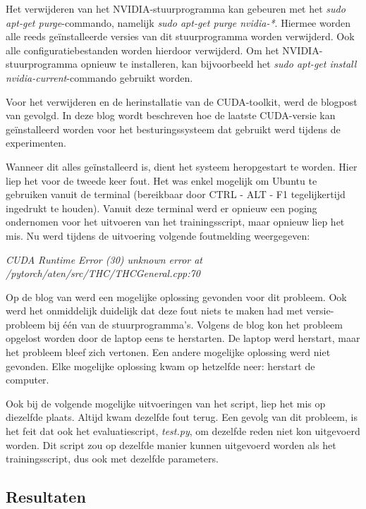 Het verwijderen van het NVIDIA-stuurprogramma kan gebeuren met het \textit{sudo apt-get purge}-commando, namelijk \textit{sudo apt-get purge nvidia-*}. Hiermee worden alle reeds geïnstalleerde versies van dit stuurprogramma worden verwijderd. Ook alle configuratiebestanden worden hierdoor verwijderd. Om het NVIDIA-stuurprogramma opnieuw te installeren, kan bijvoorbeeld het \textit{sudo apt-get install nvidia-current}-commando gebruikt worden.

Voor het verwijderen en de herinstallatie van de CUDA-toolkit, werd de blogpost van \textcite{cudainstall} gevolgd. In deze blog wordt beschreven hoe de laatste CUDA-versie kan geïnstalleerd worden voor het besturingssysteem dat gebruikt werd tijdens de experimenten.

Wanneer dit alles geïnstalleerd is, dient het systeem heropgestart te worden. Hier liep het voor de tweede keer fout. Het was enkel mogelijk om Ubuntu te gebruiken vanuit de terminal (bereikbaar door CTRL - ALT - F1 tegelijkertijd ingedrukt te houden). Vanuit deze terminal werd er opnieuw een poging ondernomen voor het uitvoeren van het trainingsscript, maar opnieuw liep het mis. Nu werd tijdens de uitvoering volgende foutmelding weergegeven:

\begin{center}
	\textit{CUDA Runtime Error (30) unknown error at /pytorch/aten/src/THC/THCGeneral.cpp:70}
\end{center}

Op de blog van \textcite{cudablog} werd een mogelijke oplossing gevonden voor dit probleem. Ook werd het onmiddelijk duidelijk dat deze fout niets te maken had met versie-probleem bij één van de stuurprogramma's. Volgens de blog kon het probleem opgelost worden door de laptop eens te herstarten. De laptop werd herstart, maar het probleem bleef zich vertonen. Een andere mogelijke oplossing werd niet gevonden. Elke mogelijke oplossing kwam op hetzelfde neer: herstart de computer.

Ook bij de volgende mogelijke uitvoeringen van het script, liep het mis op diezelfde plaats. Altijd kwam dezelfde fout terug. Een gevolg van dit probleem, is het feit dat ook het evaluatiescript, \textit{test.py}, om dezelfde reden niet kon uitgevoerd worden. Dit script zou op dezelfde manier kunnen uitgevoerd worden als het trainingsscript, dus ook met dezelfde parameters.

\subsection{Resultaten}

